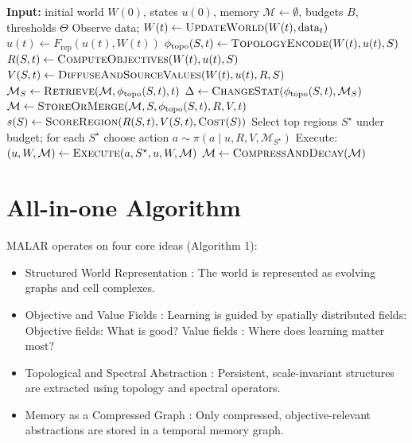 \documentclass[11pt,english]{article}
\theoremstyle{remark}
\begin{document}
\begin{algorithm}[t]
	\caption{MALAR (Multi-scale Adaptive Learning with Abstraction and Recall)}
	\begin{algorithmic}[1]
		\State \textbf{Input:} initial world $W(0)$, states $u(0)$, memory $\mathcal{M}\leftarrow \emptyset$, budgets $B$, thresholds $\Theta$
		\State Observe data; $W(t)\leftarrow \textsc{UpdateWorld}(W(t),\text{data}_t)$
		\State $u(t)\leftarrow F_{\text{rep}}(u(t),W(t))$
		\State $\phi_{\text{topo}}(S,t)\leftarrow \textsc{TopologyEncode}(W(t),u(t),S)$
		\State $R(S,t)\leftarrow \textsc{ComputeObjectives}(W(t),u(t),S)$
		\State $V(S,t)\leftarrow \textsc{DiffuseAndSourceValues}(W(t),u(t),R,S)$
		\State $\mathcal{M}_S \leftarrow \textsc{Retrieve}(\mathcal{M},\phi_{\text{topo}}(S,t),t)$
		\State $\Delta \leftarrow \textsc{ChangeStat}(\phi_{\text{topo}}(S,t),\mathcal{M}_S)$
		 $\mathcal{M}\leftarrow \textsc{StoreOrMerge}(\mathcal{M},S,\phi_{\text{topo}}(S,t),R,V,t)$ \EndIf
		\State $s(S)\leftarrow \textsc{ScoreRegion}(R(S,t),V(S,t),\textsc{Cost}(S))$
		\EndFor
		\State Select top regions $S^\star$ under budget; for each $S^\star$ choose action $a\sim \pi(a\mid u,R,V,\mathcal{M}_{S^\star})$
		\State Execute: $(u,W,\mathcal{M}) \leftarrow \textsc{Execute}(a,S^\star,u,W,\mathcal{M})$
		\State $\mathcal{M}\leftarrow \textsc{CompressAndDecay}(\mathcal{M})$
		\EndFor
	\end{algorithmic}
\end{algorithm}

\section{All-in-one Algorithm}

MALAR operates on four core ideas (Algorithm 1):
\begin{itemize}
\item Structured World Representation : The world is represented as evolving graphs and cell complexes.

\item Objective and Value Fields : Learning is guided by spatially distributed fields: Objective fields: What is good? Value fields : Where does learning matter most?

\item Topological and Spectral Abstraction : Persistent, scale-invariant structures are extracted using topology and spectral operators.

\item Memory as a Compressed Graph : Only compressed, objective-relevant abstractions are stored in a temporal memory graph.

\end{itemize}
\end{document}
